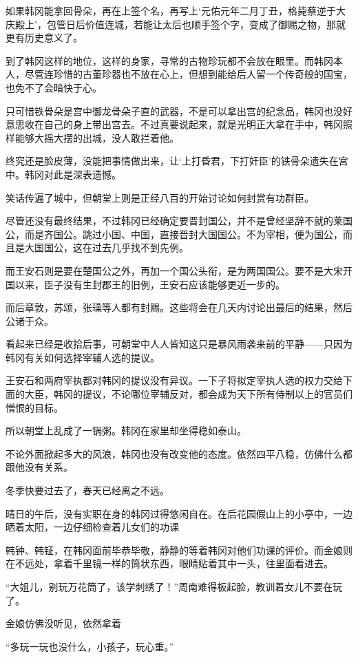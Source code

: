 如果韩冈能拿回骨朵，再在上签个名，再写上‘元佑元年二月丁丑，格毙蔡逆于大庆殿上’，包管日后价值连城，若能让太后也顺手签个字，变成了御赐之物，那就更有历史意义了。

到了韩冈这样的地位，这样的身家，寻常的古物珍玩都不会放在眼里。而韩冈本人，尽管连珍惜的古董珍器也不放在心上，但想到能给后人留一个传奇般的国宝，也免不了会暗快于心。

只可惜铁骨朵是宫中御龙骨朵子直的武器，不是可以拿出宫的纪念品，韩冈也没好意思收在自己的身上带出宫去。不过真要说起来，就是光明正大拿在手中，韩冈照样能够大摇大摆的出城，没人敢拦着他。

终究还是脸皮薄，没能把事情做出来，让‘上打昏君，下打奸臣’的铁骨朵遗失在宫中。韩冈对此是深表遗憾。

笑话传遍了城中，但朝堂上则是正经八百的开始讨论如何封赏有功群臣。

尽管还没有最终结果，不过韩冈已经确定要晋封国公，并不是曾经坚辞不就的莱国公，而是齐国公。跳过小国、中国，直接晋封大国国公。不为宰相，便为国公，而且是大国国公，这在过去几乎找不到先例。

而王安石则是要在楚国公之外，再加一个国公头衔，是为两国国公。要不是大宋开国以来，臣子没有生封郡王的旧例，王安石应该能够更近一步的。

而后章敦，苏颂，张璪等人都有封赐。这些将会在几天内讨论出最后的结果，然后公诸于众。

看起来已经是收拾后事，可朝堂中人人皆知这只是暴风雨袭来前的平静——只因为韩冈有关如何选择宰辅人选的提议。

王安石和两府宰执都对韩冈的提议没有异议。一下子将拟定宰执人选的权力交给下面的大臣，韩冈的提议，不论哪位宰辅反对，都会成为天下所有侍制以上的官员们憎恨的目标。

所以朝堂上乱成了一锅粥。韩冈在家里却坐得稳如泰山。

不论外面掀起多大的风浪，韩冈也没有改变他的态度。依然四平八稳，仿佛什么都跟他没有关系。

冬季快要过去了，春天已经离之不远。

晴日的午后，没有实职在身的韩冈过得悠闲自在。在后花园假山上的小亭中，一边晒着太阳，一边仔细检查着儿女们的功课

韩钟、韩钲，在韩冈面前毕恭毕敬，静静的等着韩冈对他们功课的评价。而金娘则在不远处，拿着千里镜一样的筒状东西，眼睛贴着其中一头，往里面看进去。

“大姐儿，别玩万花筒了，该学刺绣了！”周南难得板起脸，教训着女儿不要在玩了。

金娘仿佛没听见，依然拿着

“多玩一玩也没什么，小孩子，玩心重。”


